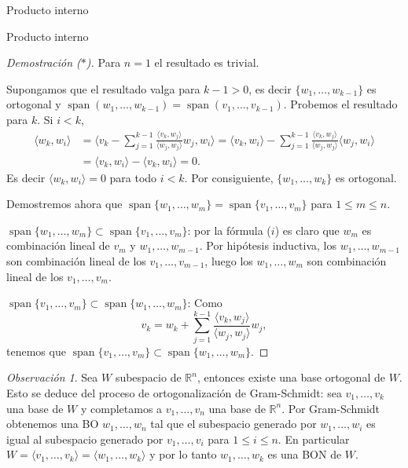 \documentclass[a4paper,12pt,twoside,spanish,reqno]{amsbook}
\numberwithin{equation}{section}
\theoremstyle{definition}
\theoremstyle{remark}
\newtheorem*{obs*}{Observaci\'on}
\newcommand{\la}{\langle}
\newcommand{\ra}{\rangle}
\newcommand{\R}{\mathbb R}
\begin{document}
\begin{chapter}{Producto interno}
\begin{section}{Producto interno}
\begin{proof}[Demostración ($*$)]
            Para $n= 1$ el resultado es trivial.
            
            Supongamos que el resultado valga para $k-1>0$, es decir  $\{w_1,\ldots, w_{k-1}\}$ es ortogonal y 
            $\operatorname{span}(w_1,\ldots, w_{k-1}) = \operatorname{span}(v_1,\ldots, v_{k-1})$. Probemos el resultado para $k$.  Si  $i < k$, 
            \begin{align*}
            \la w_k, w_i \ra &= \la  v_k - \sum_{j = 1}^{k-1} \frac{\la v_k,w_{j}\ra}{\la w_{j},w_{j}\ra}w_{j} , w_i \ra 
            = \la v_k, w_i\ra -  \sum_{j = 1}^{k-1} \frac{\la v_k,w_{j}\ra}{\la w_{j},w_{j}\ra}\la w_{j} , w_i \ra \\
            &=  \la v_k, w_i\ra -  \la v_k, w_i\ra = 0.
            \end{align*}
            Es decir $	\la w_k, w_i \ra =0$ para todo $i < k$. Por consiguiente,  $\{w_1,\ldots, w_{k}\}$ es ortogonal.
            
            Demostremos ahora que $\operatorname{span}\{w_1,\ldots, w_{m}\} = \operatorname{span}\{v_1,\ldots, v_{m}\}$ para $1 \le m \le n$. 
            
            $\operatorname{span}\{w_1,\ldots, w_{m}\} \subset \operatorname{span}\{v_1,\ldots, v_{m}\}$: por la fórmula ($i$) es claro que $w_m$  es combinación lineal de $v_m$ y $w_1,\ldots, w_{m-1}$. Por hipótesis inductiva, los $w_1,\ldots, w_{m-1}$ son combinación lineal de  los $v_1,\ldots, v_{m-1}$,  luego los $w_1,\ldots, w_{m}$ son combinación lineal de los  $v_1,\ldots, v_{m}$.
            
            $\operatorname{span}\{v_1,\ldots, v_{m}\} \subset \operatorname{span}\{w_1,\ldots, w_{m}\}$: Como
            $$
            v_k = w_k + \sum_{j = 1}^{k-1} \frac{\la v_k,w_{j}\ra}{\la w_{j},w_{j}\ra}w_{j},
            $$
            tenemos que 	$\operatorname{span}\{v_1,\ldots, v_{m}\} \subset \operatorname{span}\{w_1,\ldots, w_{m}\}$.
        \end{proof}
        
        
        \medskip
        
        \begin{obs*} Sea $W$ subespacio de $\R^n$, entonces existe una base ortogonal de $W$. Esto se deduce del proceso de ortogonalización de Gram-Schmidt: sea $v_1,\ldots,v_k$ una base de $W$ y completamos a $v_{1},\ldots,v_n$ una base de $\R^n$. Por Gram-Schmidt obtenemos una BO $w_{1},\ldots,w_n$ tal que el subespacio generado  por $w_{1},\ldots,w_i$ es igual al subespacio generado por $v_{1},\ldots,v_i$ para $1 \le i \le n$. En  particular $W = \la v_{1},\ldots,v_k \ra =  \la w_{1},\ldots,w_k \ra$ y por lo tanto  $w_{1},\ldots,w_k$ es una BON de $W$.
            

\end{obs*}
\end{section}
\end{chapter}
\end{document}
